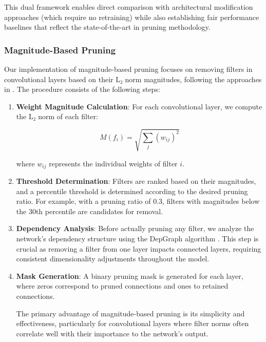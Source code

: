 \documentclass[12pt,a4paper]{article}
\begin{document}
This dual framework enables direct comparison with architectural modification approaches (which require no retraining) while also establishing fair performance baselines that reflect the state-of-the-art in pruning methodology.

\subsubsection{Magnitude-Based Pruning}

Our implementation of magnitude-based pruning focuses on removing filters in convolutional layers based on their L₂ norm magnitudes, following the approaches in \cite{Wu2023, Han2015Learning, Zhu2017To}. The procedure consists of the following steps:

\begin{enumerate}
\item \textbf{Weight Magnitude Calculation}: For each convolutional layer, we compute the L₂ norm of each filter:
   
   \begin{equation}
   M(f_i) = \sqrt{\sum_{j} (w_{ij})^2}
   \end{equation}
   
   where $w_{ij}$ represents the individual weights of filter $i$.

\item \textbf{Threshold Determination}: Filters are ranked based on their magnitudes, and a percentile threshold is determined according to the desired pruning ratio. For example, with a pruning ratio of 0.3, filters with magnitudes below the 30th percentile are candidates for removal.

\item \textbf{Dependency Analysis}: Before actually pruning any filter, we analyze the network's dependency structure using the DepGraph algorithm \cite{Fang2023DepGraph}. This step is crucial as removing a filter from one layer impacts connected layers, requiring consistent dimensionality adjustments throughout the model.

\item \textbf{Mask Generation}: A binary pruning mask is generated for each layer, where zeros correspond to pruned connections and ones to retained connections.



The primary advantage of magnitude-based pruning is its simplicity and effectiveness, particularly for convolutional layers where filter norms often correlate well with their importance to the network's output.


\end{enumerate}
\end{document}
